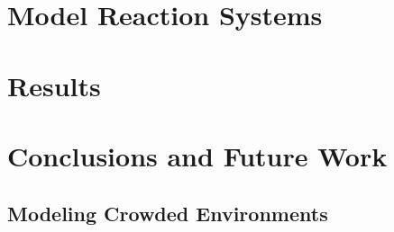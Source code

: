 \documentclass[english,letterpaper,12pt]{article}
\begin{document}
\begin{doublespacing}




\section{Model Reaction Systems} %
\label{sec:model-systems}

\section{Results} %
\label{sec:results}

\section{Conclusions and Future Work} %
\label{sec:conclusions}

\subsection{Modeling Crowded Environments} %
\label{sub:diffusion-crowded}




\end{doublespacing}

\appendix



\end{document}
